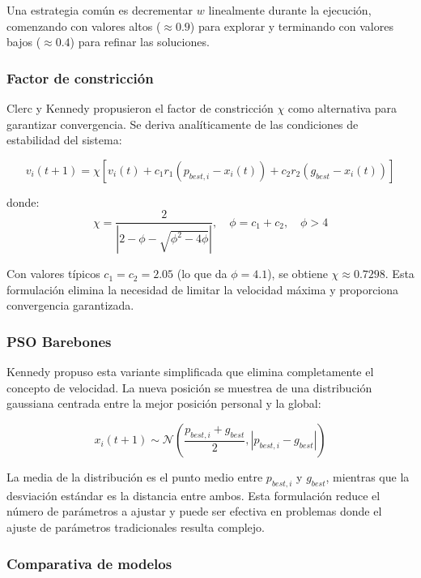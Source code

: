 Una estrategia común es decrementar $w$ linealmente durante la
ejecución, comenzando con valores altos ($\approx 0.9$) para
explorar y terminando con valores bajos ($\approx 0.4$) para
refinar las soluciones.

\subsubsection{Factor de constricción}

Clerc y Kennedy propusieron el factor de constricción $\chi$ como
alternativa para garantizar convergencia. Se deriva analíticamente
de las condiciones de estabilidad del sistema:

\begin{equation}
  v_i(t+1) = \chi \left[ v_i(t) + c_1 r_1 (p_{best,i} - x_i(t)) + c_2
  r_2 (g_{best} - x_i(t)) \right]
\end{equation}

donde:
\begin{equation}
  \chi = \frac{2}{\left| 2 - \phi - \sqrt{\phi^2 - 4\phi} \right|},
  \quad \phi = c_1 + c_2, \quad \phi > 4
\end{equation}

Con valores típicos $c_1 = c_2 = 2.05$ (lo que da $\phi = 4.1$), se
obtiene $\chi \approx 0.7298$. Esta formulación elimina la necesidad
de limitar la velocidad máxima y proporciona convergencia garantizada.

\subsubsection{PSO Barebones}

Kennedy propuso esta variante simplificada que elimina completamente
el concepto de velocidad. La nueva posición se muestrea de una
distribución gaussiana centrada entre la mejor posición personal y
la global:

\begin{equation}
  x_i(t+1) \sim \mathcal{N} \left( \frac{p_{best,i} + g_{best}}{2},
  \left|p_{best,i} - g_{best}\right| \right)
\end{equation}

La media de la distribución es el punto medio entre $p_{best,i}$ y
$g_{best}$, mientras que la desviación estándar es la distancia
entre ambos. Esta formulación reduce el número de parámetros a
ajustar y puede ser efectiva en problemas donde el ajuste de
parámetros tradicionales resulta complejo.

\subsubsection{Comparativa de modelos}

